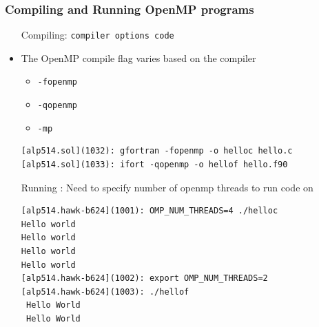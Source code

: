 \documentclass[10pt,t]{beamer}
\begin{document}
\begin{frame}[fragile]
  \frametitle{Compiling and Running OpenMP programs}
  \vspace{-0.5cm}
  \begin{itemize}
    \item[Compiling:] \lstinline[basicstyle=\normalsize\ttfamily]|compiler options code|
    \item The OpenMP compile flag varies based on the compiler
      \begin{itemize}
        \item[GNU:] \lstinline[basicstyle=\normalsize\ttfamily]|-fopenmp|
        \item[Intel:] \lstinline[basicstyle=\normalsize\ttfamily]|-qopenmp|
        \item[NVHPC:] \lstinline[basicstyle=\normalsize\ttfamily]|-mp|
      \end{itemize}
      \begin{lstlisting}[basicstyle=\small\ttfamily]
[alp514.sol](1032): gfortran -fopenmp -o helloc hello.c
[alp514.sol](1033): ifort -qopenmp -o hellof hello.f90
      \end{lstlisting}
    \item[Running]: Need to specify number of openmp threads to run code on
      \begin{lstlisting}[basicstyle=\small\ttfamily]
[alp514.hawk-b624](1001): OMP_NUM_THREADS=4 ./helloc
Hello world
Hello world
Hello world
Hello world
[alp514.hawk-b624](1002): export OMP_NUM_THREADS=2
[alp514.hawk-b624](1003): ./hellof
 Hello World
 Hello World
      \end{lstlisting}
  \end{itemize}
\end{frame}
\end{document}

